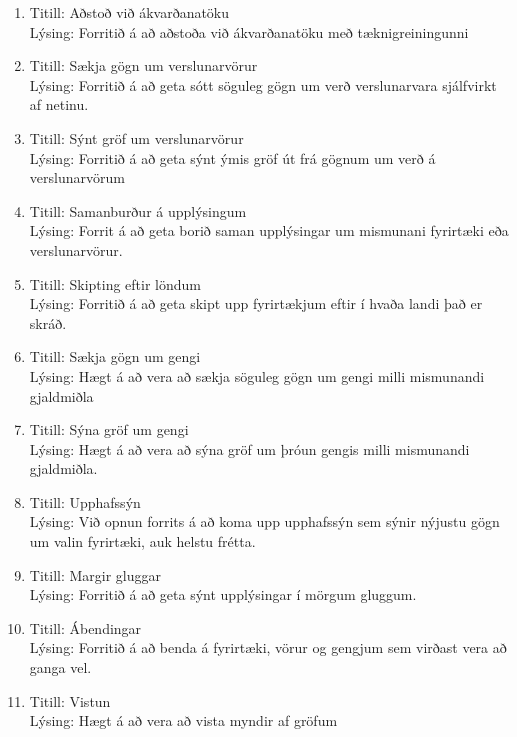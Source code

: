 \documentclass[a4,12pt]{article}
\begin{document}
\begin{enumerate}[]
\item Titill: Aðstoð við ákvarðanatöku\\
Lýsing: Forritið á að aðstoða við ákvarðanatöku með tæknigreiningunni

\item Titill: Sækja gögn um verslunarvörur\\
Lýsing: Forritið á að geta sótt söguleg gögn um verð verslunarvara sjálfvirkt af netinu.

\item Titill: Sýnt gröf um verslunarvörur\\
Lýsing: Forritið á að geta sýnt ýmis gröf út frá gögnum um verð á verslunarvörum

\item Titill: Samanburður á upplýsingum\\
Lýsing: Forrit á að geta borið saman upplýsingar um mismunani fyrirtæki eða verslunarvörur.

\item Titill: Skipting eftir löndum\\
Lýsing: Forritið á að geta skipt upp fyrirtækjum eftir í hvaða landi það er skráð.

\item Titill: Sækja gögn um gengi\\
Lýsing: Hægt á að vera að sækja söguleg gögn um gengi milli mismunandi gjaldmiðla

\item Titill: Sýna gröf um gengi\\
Lýsing: Hægt á að vera að sýna gröf um þróun gengis milli mismunandi gjaldmiðla.

\item Titill: Upphafssýn\\
Lýsing: Við opnun forrits á að koma upp upphafssýn sem sýnir nýjustu gögn um valin fyrirtæki, auk helstu frétta.

\item Titill: Margir gluggar\\
Lýsing: Forritið á að geta sýnt upplýsingar í mörgum gluggum.

\item Titill: Ábendingar\\
Lýsing: Forritið á að benda á fyrirtæki, vörur og gengjum sem virðast vera að ganga vel.

\item Titill: Vistun\\
Lýsing: Hægt á að vera að vista myndir af gröfum


\end{enumerate}
\end{document}
